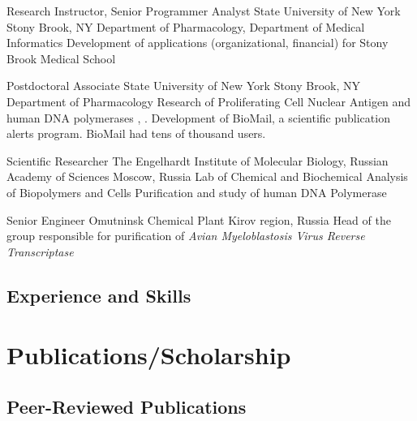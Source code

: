 \documentclass[11pt,letterpaper,sans]{moderncv} %
\begin{document}
{Research Instructor, Senior Programmer Analyst}
{State University of New York}
{Stony Brook, NY}
{Department of Pharmacology, Department of Medical Informatics}
{Development of applications (organizational, financial) for Stony Brook Medical School}

{Postdoctoral Associate}
{State University of New York}
{Stony Brook, NY}
{Department of Pharmacology}
{Research of Proliferating Cell Nuclear Antigen and human DNA polymerases \textalpha, \textepsilon. Development of BioMail, a scientific publication alerts program. BioMail had tens of thousand users.}

{Scientific Researcher}
{The Engelhardt Institute of Molecular Biology,
   Russian Academy of  Sciences}
{Moscow, Russia}
{Lab of Chemical and Biochemical Analysis of Biopolymers and Cells}
{Purification and study of human DNA Polymerase \textepsilon}

{Senior Engineer}
{Omutninsk Chemical Plant}
{Kirov region, Russia}
{}
{Head of the group responsible for purification of
  \itshape Avian Myeloblastosis Virus Reverse Transcriptase}


\subsection{Experience and Skills}


\section{Publications/Scholarship}

\subsection{Peer-Reviewed Publications}
\nocite{Thessen2022}
\nocite{Mozzherin2017}
\nocite{Patterson2016}
\nocite{Kripke2015}
\nocite{Fischer2014}
\nocite{Boyle2013}
\nocite{Morris2013}
\nocite{Thessen2012}
\nocite{Mozzherin2004}
\nocite{Fisher2004}
\nocite{Mozzherin1999}
\nocite{Mozzherin1999a}
\nocite{Zaika1999}
\nocite{Mozzherin1997}
\nocite{Mozzherin1996}
\nocite{Mozzherin1996a}
\nocite{McConnell1996}
\nocite{Jasko1995}
\nocite{Jasko1995a}
\nocite{Kukhanova1995}
\nocite{Mozzherin1992}
\nocite{Viktorova1992}
\nocite{Victorova1992a}
\nocite{Jasko1992}

\end{document}
